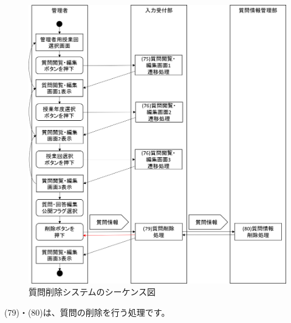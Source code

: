 \begin{figure}[htbp]
  \begin{center}
    \includegraphics[width=1\linewidth,clip]{./img/seq21.png}
    \caption{質問削除システムのシーケンス図}\label{fig:seq21}
  \end{center}
\end{figure}

(79)・(80)は、質問の削除を行う処理です。

